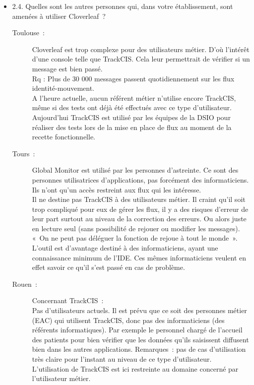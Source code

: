 \begin{itemize}
	   \item 2.4. Quelles sont les autres personnes qui, dans votre établissement,
	   sont amenées à utiliser Cloverleaf~?
	   	\begin{description}
		  	\item[Toulouse~:] Cloverleaf est trop complexe pour des utilisateurs
		  	métier. D’où l’intérêt d’une console telle que TrackCIS. Cela leur
		  	permettrait de vérifier si un message est bien passé.\\
			Rq : Plus de 30 000 messages passent quotidiennement sur les flux
			identité-mouvement.\\
			A l’heure actuelle, aucun référent métier n’utilise encore TrackCIS, même si des
			tests ont déjà été effectués avec ce type d’utilisateur. Aujourd’hui TrackCIS
			est utilisé par les équipes de la DSIO pour réaliser des tests lors de la
			mise en place de flux au moment de la recette fonctionnelle.
		  	\item[Tours~:] Global Monitor est utilisé par les personnes d’astreinte.
		  	Ce sont des personnes utilisatrices d’applications, pas forcément des
		  	informaticiens.
		  	Ils n’ont qu’un accès restreint aux flux qui les intéresse.\\
			Il ne destine pas TrackCIS à des utilisateurs métier. Il craint qu'il soit
			trop compliqué pour eux de gérer les flux, il y a des risques d’erreur de
			leur part surtout au niveau de la correction des erreurs. Ou alors juste en
			lecture seul (sans possibilité de rejouer ou modifier les messages). «~On ne
			peut pas déléguer la fonction de rejoue à tout le monde~».\\
			L’outil est d’avantage destiné à des informaticiens, ayant une connaissance
			minimum de l’IDE. Ces mêmes informaticiens veulent en effet savoir ce qu’il
			s’est passé en cas de problème.
		  	\item[Rouen~:] Concernant TrackCIS~:\\
			Pas d’utilisateurs actuels. Il est prévu que ce soit des personnes métier
			(EAC) qui utilisent TrackCIS, donc pas des informaticiens (des référents
			informatiques). Par exemple le personnel chargé de l’accueil des patients
			pour bien vérifier que les données qu’ils saisissent diffusent bien dans les
			autres applications. Remarques~: pas de cas d’utilisation très claire pour
			l’instant au niveau de ce type d’utilisateur.\\
			L’utilisation de TrackCIS est ici restreinte au domaine concerné par l’utilisateur
			métier.\\

\end{description}
\end{itemize}
